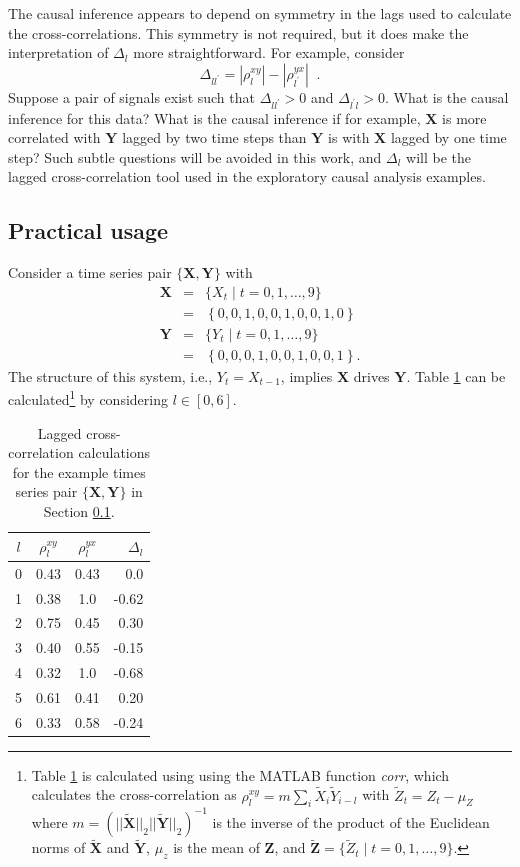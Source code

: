 The causal inference appears to depend on symmetry in the lags used to calculate the cross-correlations.  This symmetry is not required, but it does make the interpretation of $\Delta_l$ more straightforward.  For example, consider
\begin{equation}
\Delta_{ll^\prime} = |\rho^{xy}_l| - |\rho^{yx}_{l^\prime}|\;\;.
\end{equation}
Suppose a pair of signals exist such that $\Delta_{ll^\prime}>0$ and $\Delta_{l^\prime l}>0$.  What is the causal inference for this data?  What is the causal inference if for example, $\mathbf{X}$ is more correlated with $\mathbf{Y}$ lagged by two time steps than $\mathbf{Y}$ is with $\mathbf{X}$ lagged by one time step?  Such subtle questions will be avoided in this work, and $\Delta_l$ will be the lagged cross-correlation tool used in the exploratory causal analysis examples.

\subsection{Practical usage}
\label{sec:lccPUSE}
Consider a time series pair $\{\mathbf{X},\mathbf{Y}\}$ with
\begin{eqnarray*}
\mathbf{X} &=& \{X_t\; | \; t=0,1,\ldots,9\}\\
&=& \left\{0,0,1,0,0,1,0,0,1,0\right\}\\
\mathbf{Y} &=& \{Y_t\; | \; t=0,1,\ldots,9\}\\
&=& \left\{0,0,0,1,0,0,1,0,0,1\right\}.
\end{eqnarray*}
The structure of this system, i.e., $Y_t=X_{t-1}$, implies $\mathbf{X}$ drives $\mathbf{Y}$.  Table \ref{tab:lccEx} can be calculated\footnote{Table \ref{tab:lccEx} is calculated using using the {\sc MATLAB} function {\em corr}, which calculates the cross-correlation as $\rho_l^{xy} = m \sum_i \tilde{X}_i \tilde{Y}_{i-l}$ with $\tilde{Z}_t = Z_t-\mu_Z$ where $m=\left(||\tilde{\mathbf{X}}||_2||\tilde{\mathbf{Y}}||_2\right)^{-1}$ is the inverse of the product of the Euclidean norms of $\tilde{\mathbf{X}}$ and $\tilde{\mathbf{Y}}$, $\mu_z$ is the mean of $\mathbf{Z}$, and $\tilde{\mathbf{Z}} = \{\tilde{Z}_t\;|\;t=0,1,\ldots,9\}$.} by considering $l\in[0,6]$.
\begin{table}
\begin{center}
\caption[Lagged cross-correlation calculations]{Lagged cross-correlation calculations for the example times series pair $\{\mathbf{X},\mathbf{Y}\}$ in Section \ref{sec:lccPUSE}.}
\begin{tabular}{ccc|r}
$l$ & $\rho^{xy}_l$ & $\rho^{yx}_l$ & $\Delta_l$\\
\midrule
0 & 0.43 & 0.43 & 0.0\\
1 & 0.38 & 1.0 & -0.62 \\
2 & 0.75 & 0.45 & 0.30 \\
3 & 0.40 & 0.55 & -0.15 \\
4 & 0.32 & 1.0 & -0.68 \\
5 & 0.61 & 0.41 & 0.20 \\
6 & 0.33 & 0.58 & -0.24
\end{tabular}
\label{tab:lccEx}
\end{center}
\end{table}

